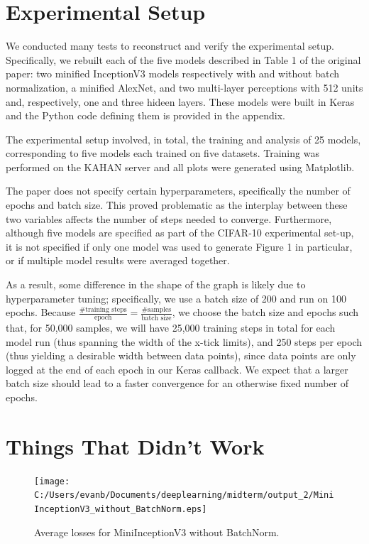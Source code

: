 \documentclass[12pt]{article}
\begin{document}
\section{Experimental Setup}

We conducted many tests to reconstruct and verify the experimental setup. Specifically, we rebuilt each of the five models described in Table 1 of the original paper: two minified InceptionV3 models respectively with and without batch normalization, a minified AlexNet, and two multi-layer perceptions with 512 units and, respectively, one and three hideen layers. These models were built in Keras and the Python code defining them is provided in the appendix.

The experimental setup involved, in total, the training and analysis of 25 models, corresponding to five models each trained on five datasets. Training was performed on the KAHAN server and all plots were generated using Matplotlib.

The paper does not specify certain hyperparameters, specifically the number of epochs and batch size. This proved problematic as the interplay between these two variables affects the number of steps needed to converge. Furthermore, although five models are specified as part of the CIFAR-10 experimental set-up, it is not specified if only one model was used to generate Figure 1 in particular, or if multiple model results were averaged together.

As a result, some difference in the shape of the graph is likely due to hyperparameter tuning; specifically, we use a batch size of 200 and run on 100 epochs. Because $\frac{\text{\# training steps}}{\text{epoch}} = \frac{\text{\# samples}}{\text{batch size}}$, we choose the batch size and epochs such that, for 50,000 samples, we will have 25,000 training steps in total for each model run (thus spanning the width of the x-tick limits), and 250 steps per epoch (thus yielding a desirable width between data points), since data points are only logged at the end of each epoch in our Keras callback. We expect that a larger batch size should lead to a faster convergence for an otherwise fixed number of epochs.

\section{Things That Didn't Work}
\begin{figure}[H]
		\centering
		\texttt{[image: C:/Users/evanb/Documents/deeplearning/midterm/output\_2/MiniInceptionV3\_without\_BatchNorm.eps]}
		\caption{Average losses for MiniInceptionV3 without BatchNorm.}
\end{figure}
\end{document}
